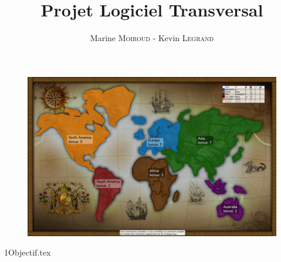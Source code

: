 \documentclass[12pt]{article}
\title{\textbf{\huge Projet Logiciel Transversal}}
\author{Marine \textsc{Moiroud} - Kevin \textsc{Legrand}}
\newcommand*{\sourcedir}{Sources/}
\begin{document}
    
    \maketitle 
     \begin{figure}[!htbp]
        \centering
        \includegraphics[width=15cm]{Images/risk.jpg}
    \end{figure}
    \newpage
    \newpage
    \tableofcontents
    \newpage
    
    {1Objectif.tex}
    \newpage
    \newpage
    \newpage
    \newpage
    \newpage
    
\end{document}
